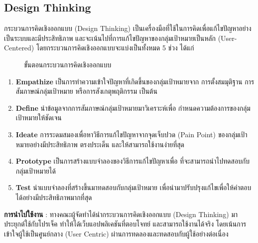 \subsection{Design Thinking}
กระบวนการคิดเชิงออกแบบ (Design Thinking) 
เป็นเครื่องมือที่ใช้ในการคิดเพื่อแก้ไขปัญหาอย่างเป็นระบบและมีประสิทธิภาพ 
และจะเน้นไปที่การแก้ไขปัญหาของกลุ่มเป้าหมายเป็นหลัก (User-Centered) 
โดยกระบวนการคิดเชิงออกแบบจะแบ่งเป็นทั้งหมด 5 ช่วง ได้แก่
\begin{figure}[!h]\centering
    \setlength{\fboxrule}{0.2mm} %
    \setlength{\fboxsep}{0.5cm}
    \caption{ขั้นตอนกระบวนการคิดเชิงออกแบบ}\label{fig:model6}
\end{figure}
\begin{enumerate}
    \item \textbf{Empathize} เป็นการทำความเข้าใจปัญหาที่เกิดขึ้นของกลุ่มเป้าหมายจาก
    การตั้งสมมุติฐาน การสัมภาษณ์กลุ่มเป้าหมาย หรือการสังเกตุพฤติกรรม เป็นต้น
    \item \textbf{Define} นำข้อมูลจากการสัมภาษณ์กลุ่มเป้าหมายมาวิเคราะห์เพื่อ
    กำหนดความต้องการของกลุ่มเป้าหมายให้ชัดเจน
    \item \textbf{Ideate} การระดมสมองเพื่อหาวิธีการแก้ไขปัญหาจากจุดเจ็บปวด 
    (Pain Point) ของกลุ่มเป้าหมายอย่างมีประสิทธิภาพ ตรงประเด็น 
    และให้สามารถใช้งานง่ายที่สุด
    \item \textbf{Prototype} เป็นการสร้างแบบจำลองของวิธีการแก้ไขปัญหาเพื่อ
    ที่จะสามารถนำไปทดสอบกับกลุ่มเป้าหมายได้
    \item \textbf{Test} นำแบบจำลองที่สร้างขึ้นมาทดสอบกับกลุ่มเป้าหมาย 
    เพื่อนำมาปรับปรุงแก้ไขเพื่อให้คำตอบได้อย่างมีประสิทธิภาพมากที่สุด
\end{enumerate}
\textbf{การนำไปใช้งาน} : ทางคณะผู้จัดทำได้นำกระบวนการคิดเชิงออกแบบ 
(Design Thinking) มาประยุกต์ใช้กับโปรเจ็ค ทำให้ได้เว็บแอปพลิเคชันที่ตอบโจทย์
และสามารถใช้งานได้จริง โดยเน้นการเข้าใจผู้ใช้เป็นศูนย์กลาง (User Centric) 
ผ่านการทดลองและทดสอบกับผู้ใช้อย่างต่อเนื่อง
